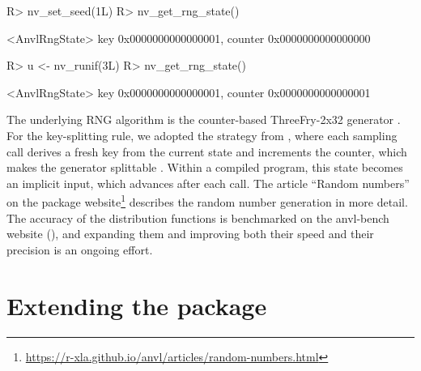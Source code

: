 \documentclass[article,shortnames]{jss}
\renewenvironment{CodeChunk}{\par\addvspace{0.6\baselineskip}\noindent\begin{minipage}{\linewidth}}{\end{minipage}\par\vspace{0.6\baselineskip}}
\begin{document}
\begin{CodeChunk}
\begin{CodeInput}
R> nv_set_seed(1L)
R> nv_get_rng_state()
\end{CodeInput}
\begin{CodeOutput}
<AnvlRngState> key 0x0000000000000001, counter 0x0000000000000000
\end{CodeOutput}
\begin{CodeInput}
R> u <- nv_runif(3L)
R> nv_get_rng_state()
\end{CodeInput}
\begin{CodeOutput}
<AnvlRngState> key 0x0000000000000001, counter 0x0000000000000001
\end{CodeOutput}
\end{CodeChunk}

The underlying RNG algorithm is the counter-based ThreeFry-2x32 generator \citep{ref-threefry}.
For the key-splitting rule, we adopted the strategy from , where each sampling call derives a fresh key from the current state and increments the counter, which makes the generator splittable \citep{ref-claessen2013splittable}.
Within a compiled program, this state becomes an implicit input, which  advances after each call.
The article ``Random numbers'' on the package website\footnote{\url{https://r-xla.github.io/anvl/articles/random-numbers.html}} describes the random number generation in more detail.
The accuracy of the distribution functions is benchmarked on the anvl-bench website (), and expanding them and improving both their speed and their precision is an ongoing effort.

\section{Extending the package}\label{extending}
\end{document}
